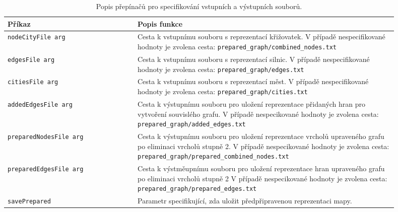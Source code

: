 \begin{table}
\centering\footnotesize\sf
\begin{tabular}{p{0.30\linewidth} p{0.6\linewidth}}
\toprule
Příkaz & Popis funkce \\
\midrule
\texttt{nodeCityFile arg} & Cesta k vstupnímu souboru s reprezentací křižovatek. 
V případě nespecifikované hodnoty je zvolena cesta:
\texttt{prepared\_graph/combined\_nodes.txt} \\
\texttt{edgesFile arg} & Cesta k vstupnímu souboru s reprezentací silnic.
V případě nespecifikované hodnoty je zvolena cesta:
\texttt{prepared\_graph/edges.txt} \\
\texttt{citiesFile arg} & Cesta k vstupnímu souboru s reprezentací měst. 
V případě nespecifikované hodnoty je zvolena cesta:
\texttt{prepared\_graph/cities.txt} \\
\texttt{addedEdgesFile arg} & Cesta k výstupnímu souboru pro uložení reprezentace 
přidaných hran pro vytvoření souvislého grafu. 
V případě nespecikované hodnoty je zvolena cesta:
\texttt{prepared\_graph/added\_edges.txt} \\
\texttt{preparedNodesFile arg} & Cesta k výstupnímu souboru pro uložení reprezentace
vrcholů upraveného grafu po eliminaci vrcholů stupně 2.
V případě nespecikované hodnoty je zvolena cesta:
\texttt{prepared\_graph/prepared\_combined\_nodes.txt} \\
\texttt{preparedEdgesFile arg} & Cesta k výstměupnímu souboru pro uložení reprezentace
hran upraveného grafu po eliminaci vrcholů stupně 2 
V případě nespecikované hodnoty je zvolena cesta:
\texttt{prepared\_graph/prepared\_edges.txt}\\
\texttt{savePrepared} & Parametr specifikující, zda uložit předpřipravenou 
reprezentaci mapy. \\
\bottomrule
\end{tabular}
\caption{Popis přepínačů pro specifikování vstupních a výstupních souborů.}
\label{tab:prepinace_soubory}
\end{table}


